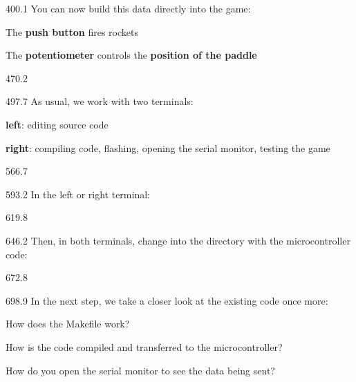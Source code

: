 \documentclass{aslab}
\begin{document}
\begin{region}[pitch=13.65]{400.1}
You can now build this data directly into the game:
\begin{dashlist}
\item The \textbf{push button} fires rockets
\item The \textbf{potentiometer} controls the \textbf{position of the paddle}
\end{dashlist}
\end{region}

\begin{region}{470.2}
\end{region}

\begin{region}[pitch=13.7]{497.7}
As usual, we work with two terminals:
\begin{dashlist}
\item \textbf{left}: editing source code
\item \textbf{right}: compiling code, flashing, opening the serial monitor,
  testing the game
\end{dashlist}
\end{region}

\begin{region}{566.7}
\end{region}

\begin{region}{593.2}
In the left or right terminal:
\end{region}

\begin{region}{619.8}
\end{region}

\begin{region}{646.2}
Then, in both terminals, change into the directory with the microcontroller
code:
\end{region}

\begin{region}{672.8}
\end{region}

\begin{region}[pitch=13]{698.9}
In the next step, we take a closer look at the existing code once more:
\begin{dashlist}
\item How does the Makefile work?
\item How is the code compiled and transferred to the microcontroller?
\item How do you open the serial monitor to see the data being sent?
\end{dashlist}
\end{region}
\end{document}
